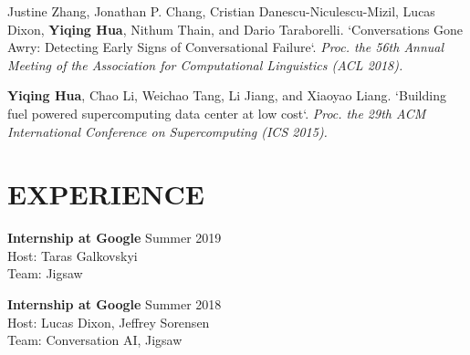 \documentclass[margin, 10pt]{res} %
\begin{document}
\begin{resume}
Justine Zhang, Jonathan P. Chang, Cristian Danescu-Niculescu-Mizil, Lucas Dixon, \textbf{Yiqing Hua}, Nithum Thain, and Dario Taraborelli.
`Conversations Gone Awry: Detecting Early Signs of Conversational Failure`.
\textit{Proc. the 56th Annual Meeting of the Association for Computational Linguistics (ACL 2018).}

\textbf{Yiqing Hua}, Chao Li, Weichao Tang, Li Jiang, and Xiaoyao Liang.
`Building fuel powered supercomputing data center at low cost`.
\textit{Proc. the 29th ACM International Conference on Supercomputing (ICS 2015).}

\section{EXPERIENCE}
\textbf{Internship at Google} \hfill Summer 2019\\
Host: Taras Galkovskyi\\
Team: Jigsaw

\textbf{Internship at Google} \hfill Summer 2018\\
Host: Lucas Dixon, Jeffrey Sorensen\\
Team: Conversation AI, Jigsaw



\end{resume}
\end{document}
